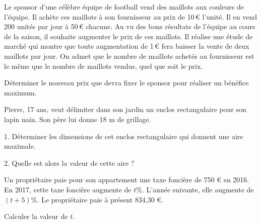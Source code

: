 \documentclass[11pt]{article}
\begin{document}
\begin{exercice}
Le sponsor d'une célèbre équipe de football vend des maillots aux couleurs de l'équipe. Il achète ces maillots à son fournisseur au prix de 10\,€ l'unité. Il en vend 200 unités par jour à 50\,€ chacune. Au vu des bons résultats de l'équipe au cours de la saison, il souhaite augmenter le prix de ces maillots. Il réalise une étude de marché qui montre que toute augmentation de 1\,€ fera baisser la vente de deux maillots par jour. On admet que le nombre de maillots achetés au fournisseur est le même que le nombre de maillots vendus, quel que soit le prix.

Déterminer le nouveau prix que devra fixer le sponsor pour réaliser un bénéfice maximum.
\end{exercice}

\begin{exercice}
Pierre, 17 ans, veut délimiter dans son jardin un enclos rectangulaire pour son lapin nain. Son père lui donne 18 m de grillage.

1. Déterminer les dimensions de cet enclos rectangulaire qui donnent une aire maximale.

2. Quelle est alors la valeur de cette aire ?
\end{exercice}



\begin{exercice}
Un propriétaire paie pour son appartement une taxe foncière de 750 € en 2016. En 2017, cette taxe foncière augmente de $t\%$. L'année suivante, elle augmente de $(t+5)\%$. Le propriétaire paie à présent 834,30 €.

Calculer la valeur de $t$.
\end{exercice}
\end{document}
